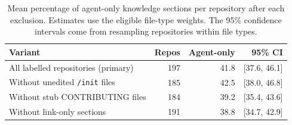 \begin{table}[t]
\caption{Mean percentage of agent-only knowledge sections per repository after each exclusion.
Estimates use the eligible file-type weights. The 95\% confidence intervals come from resampling
repositories within file types.}
\label{tab:sens}
\small\setlength{\tabcolsep}{4pt}
\begin{tabular}{@{}lrrr@{}}
\toprule
Variant & Repos & Agent-only & 95\% CI \\
\midrule
All labelled repositories (primary) & 197 & 41.8 & {\scriptsize[37.6, 46.1]} \\
Without unedited \texttt{/init} files & 185 & 42.5 & {\scriptsize[38.0, 46.8]} \\
Without stub CONTRIBUTING files & 184 & 39.2 & {\scriptsize[35.4, 43.6]} \\
Without link-only sections & 191 & 38.8 & {\scriptsize[34.7, 42.9]} \\
\bottomrule
\end{tabular}
\end{table}
